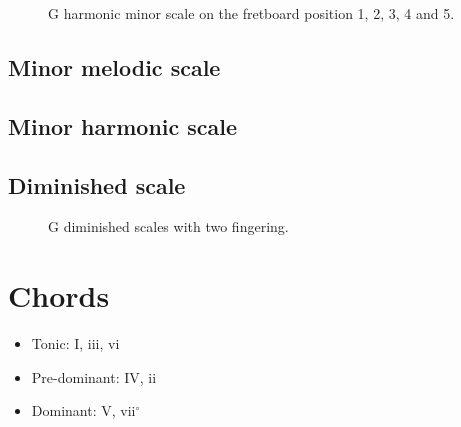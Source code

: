 \documentclass{article}
\begin{document}
\begin{figure}[h!]
	\centering
	\hspace*{-2cm}
	\scalebox{0.5}{}
	\hspace*{-2cm}
	\scalebox{0.5}{}
	\hspace*{-2cm}
	\scalebox{0.5}{}
	\hspace*{-2cm}
	\scalebox{0.5}{}
	\hspace*{-2cm}
	\scalebox{0.5}{}
	\caption{G harmonic minor scale on the fretboard position 1, 2, 3, 4 and 5.}
	\label{fig:gamme_mineur_harmo}
\end{figure}


\subsection{Minor melodic scale}

\subsection{Minor harmonic scale}

\subsection{Diminished scale}
\begin{figure}[h!]
	\centering
	\hspace*{-2cm}
	\scalebox{0.5}{}
	\hspace*{-2cm}
	\scalebox{0.5}{}
	\caption{G diminished scales with two fingering. }
	\label{fig:gammme_diminue}
\end{figure}


\clearpage
\section{Chords}

\begin{itemize}
	\item Tonic: I, iii, vi
	\item Pre-dominant: IV, ii
	\item Dominant: V, vii$^\circ$
\end{itemize}
\end{document}

